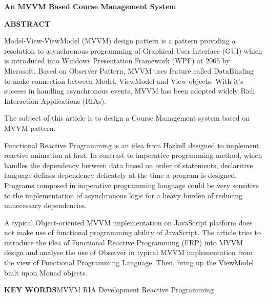 \begin{center}
\textbf{An MVVM Based Course Management System}
\end{center}
\begin{center}
\textbf{ABSTRACT}
\end{center}
\vspace{2mm}

Model-View-ViewModel (MVVM) design pattern is a pattern providing a resolution to asynchronous programming of Graphical User Interface (GUI) which is introduced into Windows Presentation Framework (WPF) at 2005 by Microsoft. Based on Observer Pattern, MVVM uses feature called DataBinding to make connection between Model, ViewModel and View objects. With it's success in handling asynchronous events, MVVM has been adopted widely Rich Interaction Applications (RIAs).

The subject of this article is to design a Course Management system based on MVVM pattern.

Functional Reactive Programming is an idea from Haskell designed to implement reactive animation at first. In contrast to imperative programming method, which handles the dependency between data based on order of statements, declaritive language defines dependency delicately at the time a program is designed. Programs composed in imperative programming language could be very sensitive to the implementation of asynchronous logic for a heavy burden of reducing unnecessary dependencies.

A typical Object-oriented MVVM implementation on JavaScript platform does not make use of functional programming ability of JavaScript. The article tries to introduce the idea of Functional Reactive Programming (FRP) into MVVM design and analyse the use of Observer in typical MVVM implementation from the view of Functional Programming Language. Then, bring up the ViewModel built upon Monad objects.

\vspace{3mm}
\textbf{KEY WORDS}\quad MVVM \quad RIA Development \quad Reactive Programming
